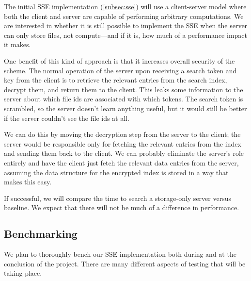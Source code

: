 \documentclass[onecolumn, draftclsnofoot,10pt, compsoc]{IEEEtran}
\begin{document}



The initial SSE implementation (\ref{subsec:sse}) will use a client-server model where both the client and server are capable of performing arbitrary computations.
We are interested in whether it is still possible to implement the SSE when the server can only store files, not compute---and if it is, how much of a performance impact it makes.

One benefit of this kind of approach is that it increases overall security of the scheme.
The normal operation of the server upon receiving a search token and key from the client is to retrieve the relevant entries from the search index, decrypt them, and return them to the client.
This leaks some information to the server about which file ids are associated with which tokens.
The search token is scrambled, so the server doesn't learn anything useful, but it would still be better if the server couldn't see the file ids at all. 

We can do this by moving the decryption step from the server to the client; 
the server would be responsible only for fetching the relevant entries from the index and sending them back to the client.
We can probably eliminate the server's role entirely and have the client just fetch the relevant data entries from the server, assuming the data structure for the encrypted index is stored in a way that makes this easy.


If successful, we will compare the time to search a storage-only server versus baseline. We expect that there will not be much of a difference in performance.

\subsection {Benchmarking}
\label{subsec:benchmark}

We plan to thoroughly bench our SSE implementation both during and at the conclusion of the project.
There are many different aspects of testing that will be taking place.
\end{document}
